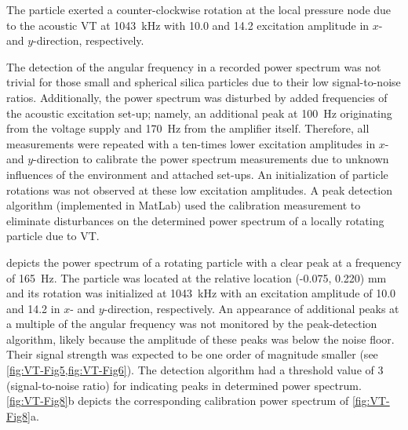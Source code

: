 The particle exerted a counter-clockwise rotation at the local pressure node due 
to the acoustic VT at \SI{1043}{\kilo\hertz} with \SI{10.0}{\Vrms} and 
\SI{14.2}{\Vrms} excitation amplitude in $x$- and $y$-direction, respectively.

The detection of the angular frequency in a recorded power spectrum was not 
trivial for those small and spherical silica particles due to their low 
signal-to-noise ratios. Additionally, the power spectrum was disturbed by added 
frequencies of the acoustic excitation set-up; namely, an additional peak at 
\SI{100}{\hertz} originating from the voltage supply and \SI{170}{\hertz} from 
the amplifier itself.  Therefore, all measurements were repeated with a 
ten-times lower excitation amplitudes in $x$- and $y$-direction to calibrate the 
power spectrum measurements due to unknown influences of the environment and 
attached set-ups. An initialization of particle rotations was not observed at 
these low excitation amplitudes. A peak detection algorithm (implemented in 
MatLab) used the calibration measurement to eliminate disturbances on the 
determined power spectrum of a locally rotating particle due to VT.\@

 depicts the power spectrum of a rotating particle with a clear 
peak at a frequency of \SI{165}{\hertz}. The particle was located at the 
relative location (-0.075, 0.220) \si{\mm} and its rotation was initialized at 
\SI{1043}{\kilo\hertz} with an excitation amplitude of \SI{10.0}{\Vrms} and 
\SI{14.2}{\Vrms} in $x$- and $y$-direction, respectively.  An appearance of 
additional peaks at a multiple of the angular frequency was not monitored by the 
peak-detection algorithm, likely because the amplitude of these peaks was below 
the noise floor. Their signal strength was expected to be one order of 
magnitude smaller (see \cref{fig:VT-Fig5,fig:VT-Fig6}).  The detection 
algorithm had a threshold value of 3 (signal-to-noise ratio) for indicating 
peaks in determined power spectrum.  \cref{fig:VT-Fig8}b depicts the 
corresponding calibration power spectrum of \cref{fig:VT-Fig8}a.

